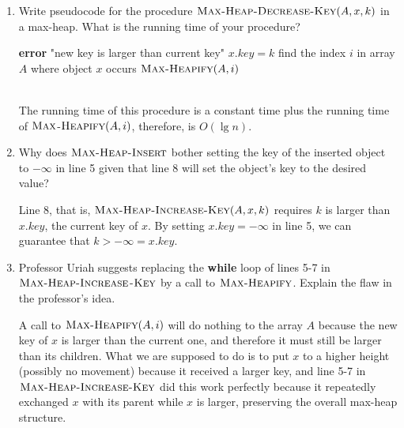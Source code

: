 \documentclass[12pt,reqno]{amsart}
\newif\ifanswer
\begin{document}
\begin{enumerate}[1.]
\item Write pseudocode for the procedure $\textsc{Max-Heap-Decrease-Key}(A, x, k)$ in a max-heap. What is the running time of your procedure?

\ifanswer
{}
\begin{algorithm}
    \caption{$\textsc{Max-Heap-Decrease-Key}(A, x, k)$}
    \begin{algorithmic}[1]
            \STATE \textbf{error} "new key is larger than current key"
        \ENDIF
        \STATE $x.key = k$
        \STATE find the index $i$ in array $A$ where object $x$ occurs
        \STATE $\textsc{Max-Heapify}(A, i)$
    \end{algorithmic}
\end{algorithm}
\\The running time of this procedure is a constant time plus the running time of $\textsc{Max}$-$\textsc{Heapify}(A, i)$, therefore, is $O(\lg{n})$.
\vspace{1cm}



\item Why does $\textsc{Max-Heap-Insert}$ bother setting the key of the inserted object to $-\infty$ in line 5 given that line 8 will set the object's key to the desired value?

\ifanswer
{}
Line 8, that is, $\textsc{Max-Heap-Increase-Key}(A, x, k)$ requires $k$ is larger than $x.key$, the current key of $x$. By setting $x.key = -\infty$ in line 5, we can guarantee that $k > -\infty = x.key$.
\vspace{1cm}



\item Professor Uriah suggests replacing the \textbf{while} loop of lines 5-7 in $\textsc{Max-Heap-Increase}$-$\textsc{Key}$ by a call to $\textsc{Max-Heapify}$. Explain the flaw in the professor's idea.

\ifanswer
{}
A call to $\textsc{Max-Heapify}(A, i)$ will do nothing to the array $A$ because the new key of $x$ is larger than the current one, and therefore it must still be larger than its children. What we are supposed to do is to put $x$ to a higher height (possibly no movement) because it received a larger key, and line 5-7 in $\textsc{Max-Heap-Increase-Key}$ did this work perfectly because it repeatedly exchanged $x$ with its parent while $x$ is larger, preserving the overall max-heap structure.
\vspace{1cm}




\end{enumerate}
\end{document}
